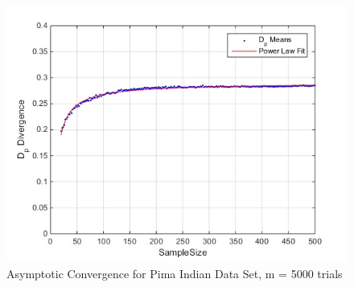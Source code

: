 \documentclass{article}
\begin{document}
	\begin{figure}[!h]
		\caption{Asymptotic Convergence for Pima Indian Data Set, m = 5000 trials}
		\centering
		\includegraphics[scale=0.6]{dp_n5000_pima}
	\end{figure}	
\end{document}
